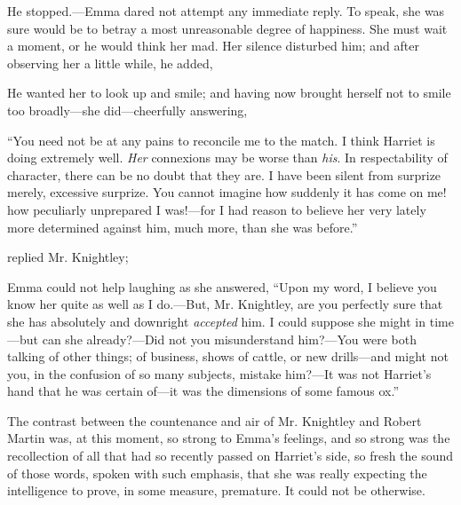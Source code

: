 He stopped.---Emma dared not attempt any immediate reply. To speak, she was sure would be to betray a most unreasonable degree of happiness. She must wait a moment, or he would think her mad. Her silence disturbed him; and after observing her a little while, he added,


He wanted her to look up and smile; and having now brought herself not to smile too broadly---she did---cheerfully answering,

“You need not be at any pains to reconcile me to the match. I think Harriet is doing extremely well. {\em Her} connexions may be worse than {\em his}. In respectability of character, there can be no doubt that they are. I have been silent from surprize merely, excessive surprize. You cannot imagine how suddenly it has come on me! how peculiarly unprepared I was!---for I had reason to believe her very lately more determined against him, much more, than she was before.”

 replied Mr. Knightley; 

Emma could not help laughing as she answered, “Upon my word, I believe you know her quite as well as I do.---But, Mr. Knightley, are you perfectly sure that she has absolutely and downright {\em accepted} him. I could suppose she might in time---but can she already?---Did not you misunderstand him?---You were both talking of other things; of business, shows of cattle, or new drills---and might not you, in the confusion of so many subjects, mistake him?---It was not Harriet's hand that he was certain of---it was the dimensions of some famous ox.”

The contrast between the countenance and air of Mr. Knightley and Robert Martin was, at this moment, so strong to Emma's feelings, and so strong was the recollection of all that had so recently passed on Harriet's side, so fresh the sound of those words, spoken with such emphasis,  that she was really expecting the intelligence to prove, in some measure, premature. It could not be otherwise.

